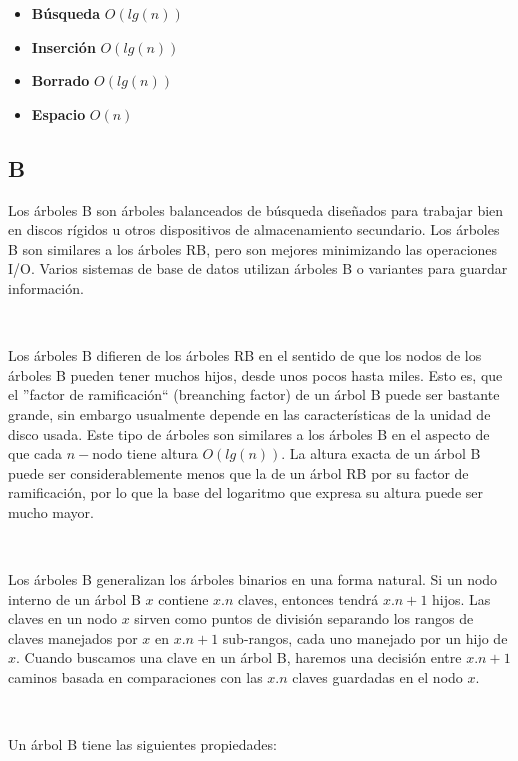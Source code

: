 \begin{itemize}
 \item \textbf{B\'usqueda} $O(lg(n))$
 \item \textbf{Inserci\'on} $O(lg(n))$
 \item \textbf{Borrado} $O(lg(n))$
 \item \textbf{Espacio} $O(n)$
\end{itemize}

\subsection{B}

Los \'arboles B son \'arboles balanceados de b\'usqueda dise\~nados para trabajar bien en discos r\'igidos u otros dispositivos de almacenamiento secundario. Los \'arboles B son similares a los \'arboles RB, pero son mejores minimizando las operaciones I/O. Varios sistemas de base de datos utilizan \'arboles B o variantes para guardar informaci\'on.

~

Los \'arboles B difieren de los \'arboles RB en el sentido de que los nodos de los \'arboles B pueden tener muchos hijos, desde unos pocos hasta miles. Esto es, que el ''factor de ramificaci\'on`` (breanching factor) de un \'arbol B puede ser bastante grande, sin embargo usualmente depende en las caracter\'isticas de la unidad de disco usada. Este tipo de \'arboles son similares a los \'arboles B en el aspecto de que cada $n-$nodo tiene altura $O(lg(n))$. La altura exacta de un \'arbol B puede ser considerablemente menos que la de un \'arbol RB por su factor de ramificaci\'on, por lo que la base del logaritmo que expresa su altura puede ser mucho mayor.

~

Los \'arboles B generalizan los \'arboles binarios en una forma natural. Si un nodo interno de un \'arbol B $x$ contiene $x.n$ claves, entonces tendr\'a $x.n+1$  hijos. Las claves en un nodo $x$ sirven como puntos de divisi\'on separando los rangos de claves manejados por $x$ en $x.n+1$ sub-rangos, cada uno manejado por un hijo de $x$. Cuando buscamos una clave en un \'arbol B, haremos una decisi\'on entre $x.n+1$ caminos basada en comparaciones con las $x.n$ claves guardadas en el nodo $x$.

~

Un \'arbol B tiene las siguientes propiedades:

